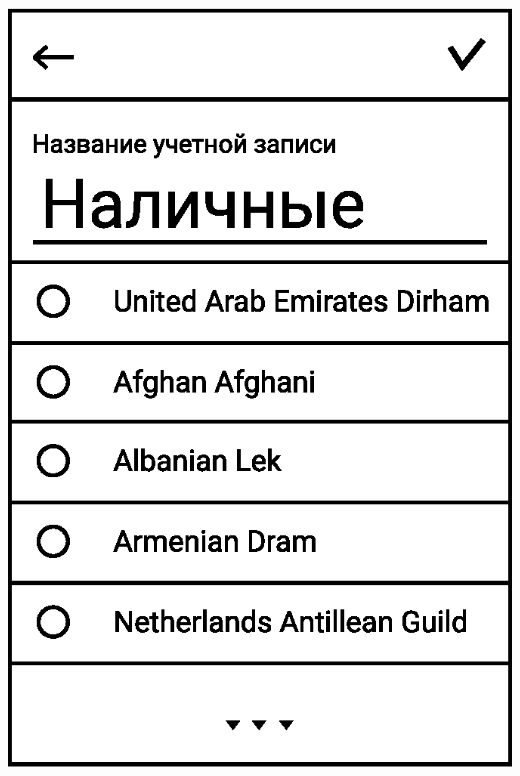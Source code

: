 \documentclass[russian,utf8,a1paper,nostitching,simple]{eskdgraph}
\begin{document}
\begin{ESKDdrawing}
\begin{minipage}{28cm}
\begin{minipage}{7.5cm}
      \centering
      \includegraphics[width=\linewidth]{fig/ui_activities_accounts_edit.eps}


\end{minipage}
\end{minipage}
\end{ESKDdrawing}
\end{document}
